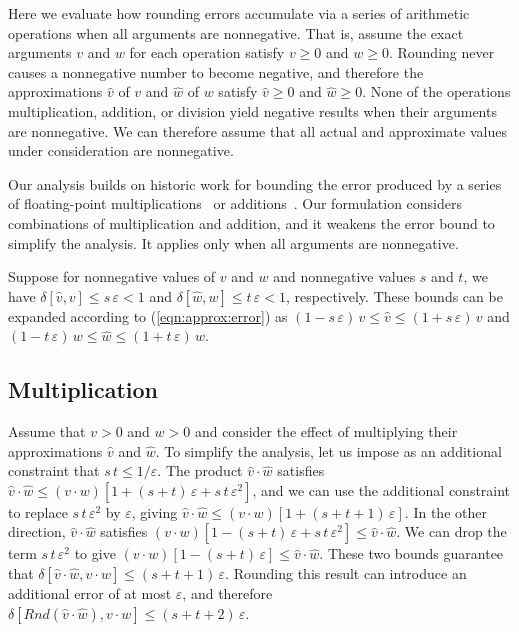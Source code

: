 \documentclass[letterpaper,USenglish,cleveref, autoref, thm-restate]{lipics-v2021}
\newcommand{\approximate}[1]{\hat{#1}}
\newcommand{\approxv}{\approximate{v}}
\newcommand{\approxw}{\approximate{w}}
\newcommand{\round}{\mathit{Rnd}}
\newcommand{\aerror}{\delta}
\newcommand{\roundepsilon}{\varepsilon}
\begin{document}
Here we evaluate how rounding errors accumulate via a series of
arithmetic operations when all arguments are nonnegative.
That is, assume the exact arguments $v$ and $w$ for each operation satisfy $v \geq 0$ and $w \geq 0$.
Rounding never causes a nonnegative number to become negative, and therefore 
the approximations $\approxv$ of  $v$ and $\approxw$ of $w$ satisfy $\approxv \geq 0$ and $\approxw \geq 0$.
None of the operations multiplication, addition, or division yield negative results when their arguments are nonnegative.
We can therefore
assume that all actual and approximate values under consideration are
nonnegative.

Our analysis builds on historic work for bounding the error produced
by a series of floating-point
multiplications~\cite{muller:hfpa:2018,rump:bit:2015,wilkinson:nm:1960,wilkinson:rounding:1964} or
additions~\cite{higham:siam:1993}.  Our formulation considers combinations of multiplication and addition, and it weakens the error bound to simplify the analysis.
It
applies only when all arguments are nonnegative.

Suppose for nonnegative values of $v$ and $w$ and nonnegative values $s$ and $t$, we have
$\aerror[\approxv, v] \leq s\, \roundepsilon < 1$ and
$\aerror[\approxw, w] \leq t\, \roundepsilon < 1$, respectively.
These bounds can be expanded according to (\ref{eqn:approx:error}) as
$(1-s\,\roundepsilon)\, v \leq \approxv \leq (1+s\,\roundepsilon)\, v$ and
$(1-t\,\roundepsilon)\, w \leq \approxw \leq (1+t\,\roundepsilon)\, w$.


\subsection{Multiplication}

Assume that $v > 0$ and $w > 0$ and consider the effect of multiplying their approximations
$\approxv$ and $\approxw$.  To simplify the analysis, let us impose as an additional constraint that $s\,t \leq 1/\roundepsilon$.
The product $\approxv \cdot \approxw$  satisfies
$\approxv \cdot \approxw \leq (v\cdot w) [1 + (s+t)\,\roundepsilon + s\,t\,\roundepsilon^2]$, and we can use the additional constraint to replace $s\,t\,\roundepsilon^2$ by $\roundepsilon$,
giving
$\approxv \cdot \approxw \leq (v\cdot w) [1 + (s+t+1)\,\roundepsilon]$.
In the other direction, $\approxv \cdot \approxw$ satisfies
$(v\cdot w) [1 - (s+t)\,\roundepsilon + s\,t\,\roundepsilon^2] \leq \approxv \cdot \approxw$.  We can drop the term
$s\,t\,\roundepsilon^2$ to give
$(v\cdot w) [1 - (s+t)\,\roundepsilon] \leq \approxv \cdot \approxw$.  These two bounds guarantee that
$\aerror[\approxv \cdot \approxw, v \cdot w] \leq (s+t+1)\,\roundepsilon$.
Rounding this result can introduce an additional error of at most $\roundepsilon$, and therefore
$\aerror[\round(\approxv \cdot \approxw), v \cdot w] \leq (s+t+2)\,\roundepsilon$.
\end{document}
